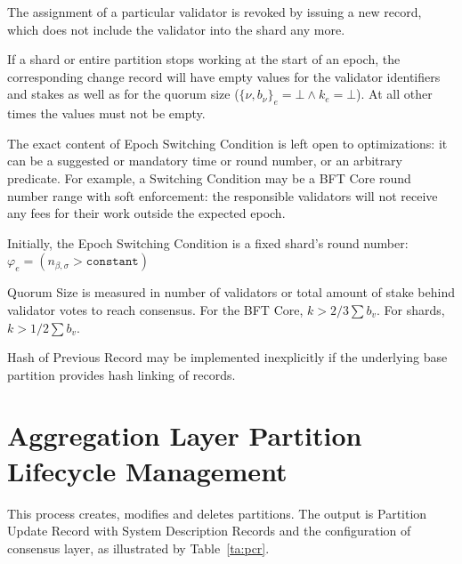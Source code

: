 The assignment of a particular validator is revoked by issuing a new record, which does not include the validator into the shard any more.

If a shard or entire partition stops working at the start of an epoch, the corresponding change record will have empty values for the validator identifiers and stakes as well as for the quorum size ($\{\nu, b_\nu\}_e = \bot \land k_e = \bot$). At all other times the values must not be empty.

The exact content of Epoch Switching Condition is left open to optimizations: it can be a suggested or mandatory time or round number, or an arbitrary predicate. For example, a Switching Condition may be a BFT Core round number range with soft enforcement: the responsible validators will not receive any fees for their work outside the expected epoch.

Initially, the Epoch Switching Condition is a fixed shard's round number: $\varphi_e = (n_{\beta,\sigma} > \mathtt{constant})$

Quorum Size is measured in number of validators or total amount of stake behind validator votes to reach consensus. For the BFT Core, $k > 2/3 \sum{b_v}$. For shards, $k > 1/2 \sum{b_v}$.

Hash of Previous Record may be implemented inexplicitly if the underlying base partition provides hash linking of records.


\section{Aggregation Layer Partition Lifecycle Management}

This process creates, modifies and deletes partitions. The output is Partition Update Record with System Description Records and the configuration of consensus layer, as illustrated by Table~\ref{ta:pcr}.

